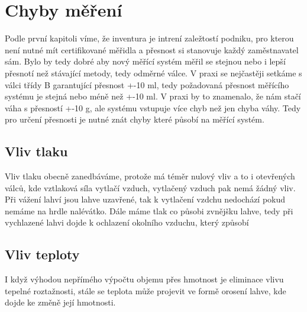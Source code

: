

\section{Chyby měření}
Podle první kapitoli víme, že inventura je intrení zaležtostí podniku, pro kterou není nutné mít certifikované měřidla a přesnost si stanovuje každý zaměstnavatel sám. Bylo by tedy dobré aby nový měřící systém měřil se stejnou nebo i lepší přesnotí než stávající metody, tedy odměrné válce. V praxi se nejčastěji setkáme s válci třídy B garantující přesnost +-10 ml, tedy požadovaná přesnost měřícího systému je stejná nebo méně než +-10 ml. V praxi by to znamenalo, že nám stačí váha s přesností +-10 g, ale systému vstupuje více chyb než jen chyba váhy.
Tedy pro určení přesnosti je nutné znát chyby které působí na měřící systém.
\subsection{Vliv tlaku}
Vliv tlaku obecně zanedbáváme, protože má téměr nulový vliv a to i otevřených válců, kde vztlaková síla vytlačí vzduch, vytlačený vzduch pak nemá žádný vliv. Při vážení lahví jsou lahve uzavřené, tak k vytlačení vzdchu nedochází pokud nemáme na hrdle nalévátko. Dále máme tlak co působi zvnějšku lahve, tedy při vychlazené lahvi dojde k ochlazení okolního vzduchu, který způsobí 

\subsection{Vliv teploty}
I když výhodou nepřímého výpočtu objemu přes hmotnost je eliminace vlivu tepelné roztažnosti, stále se teplota může projevit ve formě orosení lahve, kde dojde ke změně její hmotnosti.

